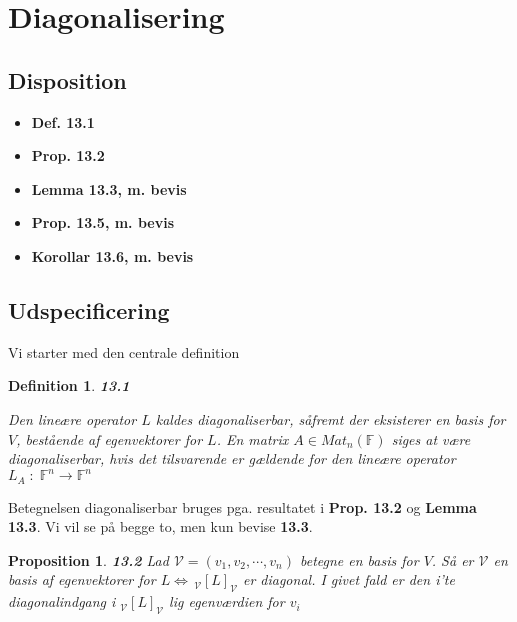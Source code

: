 \documentclass[paper=a4, fontsize=11pt]{scrartcl} %
\newtheorem*{definition}{Definition}
\newtheorem*{proposition}{Proposition}
\newenvironment{cstmproposition}[1]{\begin{proposition} {\normalfont\textbf{#1}}}{\end{proposition}}
\newenvironment{cstmdefinition}[1]{\begin{definition} {\normalfont\textbf{#1}}}{\end{definition}}
\begin{document}
	\newpage
	
	\section{Diagonalisering}
	
	\subsection{Disposition}
	
	\begin{itemize}
		\item \textbf{Def. 13.1}
		\item \textbf{Prop. 13.2}
		\item \textbf{Lemma 13.3, m. bevis}
		\item \textbf{Prop. 13.5, m. bevis}
		\item \textbf{Korollar 13.6, m. bevis}
	\end{itemize}
	
	\subsection{Udspecificering}
	
	
	Vi starter med den centrale definition
	
	\begin{cstmdefinition}{13.1}
		
		Den lineære operator $L$ kaldes diagonaliserbar, såfremt der eksisterer en basis for $V$, bestående af egenvektorer for $L$. En matrix $A \in Mat_n(\mathbb{F})$ siges at være diagonaliserbar, hvis det tilsvarende er gældende for den lineære operator $L_A \; : \; \mathbb{F}^n \rightarrow \mathbb{F}^n$
		
		
	\end{cstmdefinition}
	
	Betegnelsen diagonaliserbar bruges pga. resultatet i \textbf{Prop. 13.2} og \textbf{Lemma 13.3}. Vi vil se på begge to, men kun bevise \textbf{13.3}.
	
	\begin{cstmproposition}{13.2}
		Lad $\mathcal{V} = (v_1,v_2,\cdots,v_n)$ betegne en basis for $V$. Så er $\mathcal{V}$ en basis af egenvektorer for $L \Leftrightarrow \, _{\mathcal{V}}[L]_{\mathcal{V}}$ er diagonal. I givet fald er den i'te diagonalindgang i $_{\mathcal{V}}[L]_{\mathcal{V}}$ lig egenværdien for $v_i$   
		
	\end{cstmproposition}
	
\end{document}
